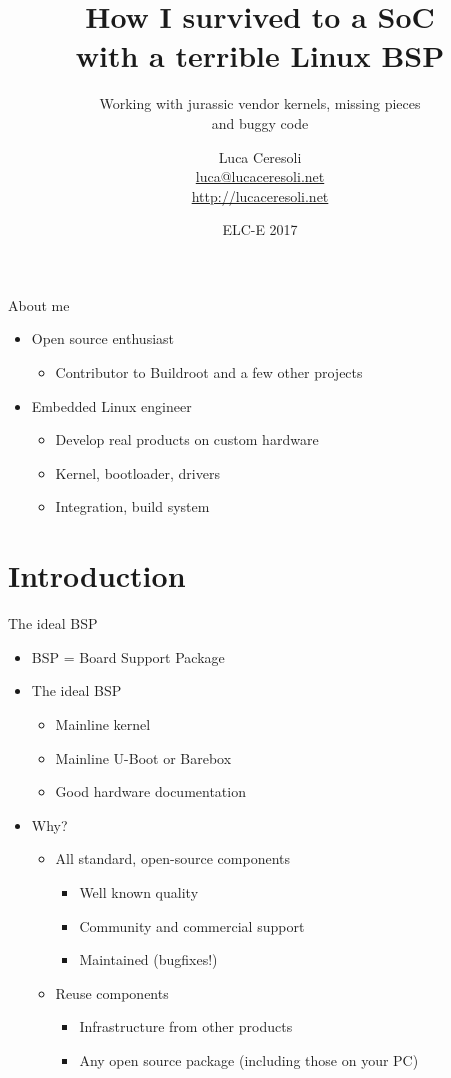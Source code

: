 \documentclass[xetex,table]{beamer}
\title{How I survived to a SoC\\with a terrible Linux BSP}
\subtitle{Working with jurassic vendor kernels, missing pieces\\and buggy code}
\author{Luca Ceresoli\\
  \href{mailto:luca@lucaceresoli.net}{luca@lucaceresoli.net}\\
  \url{http://lucaceresoli.net}
}
\date{ELC-E 2017}
\begin{document}
\maketitle

\begin{frame}{About me}
  \begin{itemize}
  \item Open source enthusiast
    \begin{itemize}
    \item Contributor to Buildroot and a few other projects
    \end{itemize}
  \item Embedded Linux engineer
    \begin{itemize}
    \item Develop real products on custom hardware
    \item Kernel, bootloader, drivers
    \item Integration, build system
    \end{itemize}
  \end{itemize}
\end{frame}

\section{Introduction}

\begin{frame}{The ideal BSP}
  \begin{itemize}
  \item BSP = Board Support Package
  \item The ideal BSP
    \begin{itemize}
    \item Mainline kernel
    \item Mainline U-Boot or Barebox
    \item Good hardware documentation
    \end{itemize}
  \item Why?
    \begin{itemize}
    \item All standard, open-source components
      \begin{itemize}
      \item Well known quality
      \item Community and commercial support
      \item Maintained (bugfixes!)
      \end{itemize}
    \item Reuse components
      \begin{itemize}
      \item Infrastructure from other products
      \item Any open source package (including those on your PC)
      \end{itemize}
    \end{itemize}
  \end{itemize}
\end{frame}
\end{document}
